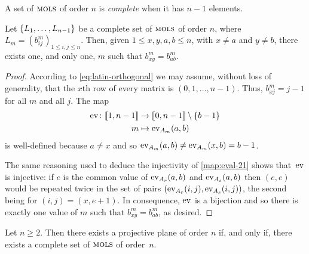 \begin{defn}
    A set of $\mols$ of order $n$ is \textsl{complete} when it has $n-1$ elements.
\end{defn}

\begin{lem}\label{lem:mols-P1}
    Let $\set{L_1,\dots,L_{n-1}}$ be a complete set of $\mols$ of order $n$, where $L_m=(b^m_{ij})_{1\le i,j\le n}$. Then, given $1\le x,y,a,b\le n$, with $x\ne a$ and $y\ne b$, there exists one, and only one, $m$ such that $b^m_{xy}=b^m_{ab}$.
\end{lem}

\begin{proof}
    According to \eqref{eq:latin-orthogonal} we may assume, without loss of generality, that the $x$th row of every matrix is $(0,1,\dots,n-1)$. Thus, $b^m_{xj}=j-1$ for all $m$ and all $j$.
    The map
    \begin{align}\label{map:ev-ab}
        \ev{}\colon\nset{n-1}
            &\to\nset[0]{n-1}\setminus\set{b-1}\\
        m&\mapsto \ev{A_m}(a,b)
    \end{align}
    is well-defined because $a\ne x$ and so $\ev{A_m}(a,b)\ne\ev{A_m}(x,b)=b-1$.
    
    The same reasoning used to deduce the injectivity of \eqref{map:eval-21} shows that~$\ev{}$ is injective: if $e$ is the common value of $\ev{A_r}(a,b)$ and $\ev{A_s}(a,b)$ then $(e,e)$ would be repeated twice in the set of pairs $(\ev{A_r}(i,j),\ev{A_s}(i,j))$, the second being for $(i,j)=(x,e+1)$. In consequence, $\ev{}$ is a bijection and so there is exactly one value of $m$ such that $b^m_{xy}=b^m_{ab}$, as desired.
    
\end{proof}

\begin{thm}\label{thm:mols-equivalence}
    Let\/ $n\ge2$. Then there exists a projective plane of order\/ $n$ if, and only if, there exists a complete set of $\mols$ of order\/~$n$.
\end{thm}

